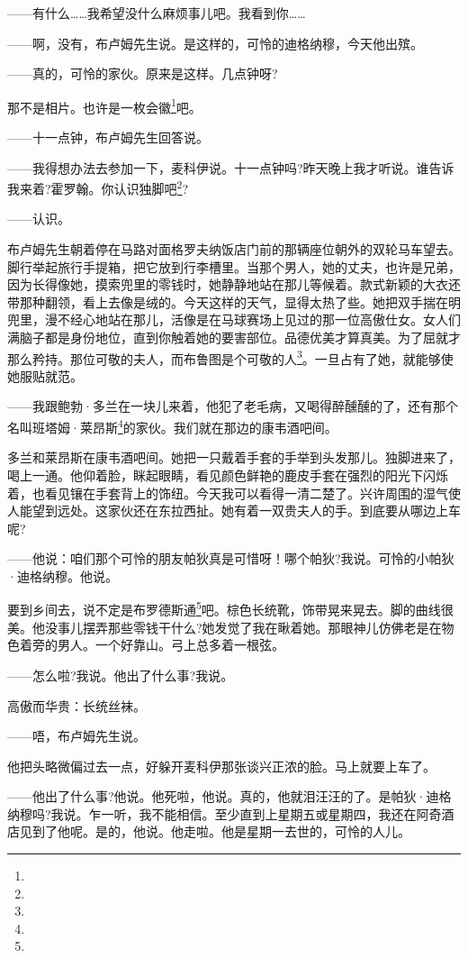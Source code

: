 \par ——有什么……我希望没什么麻烦事儿吧。我看到你……
\par ——啊，没有，布卢姆先生说。是这样的，可怜的迪格纳穆，今天他出殡。
\par ——真的，可怜的家伙。原来是这样。几点钟呀?
\par 那不是相片。也许是一枚会徽\footnote{}吧。
\par ——十一点钟，布卢姆先生回答说。
\par ——我得想办法去参加一下，麦科伊说。十一点钟吗?昨天晚上我才听说。谁告诉我来着?霍罗翰。你认识独脚吧\footnote{}?
\par ——认识。
\par 布卢姆先生朝着停在马路对面格罗夫纳饭店门前的那辆座位朝外的双轮马车望去。脚行举起旅行手提箱，把它放到行李槽里。当那个男人，她的丈夫，也许是兄弟，因为长得像她，摸索兜里的零钱时，她静静地站在那儿等候着。款式新颖的大衣还带那种翻领，看上去像是绒的。今天这样的天气，显得太热了些。她把双手揣在明兜里，漫不经心地站在那儿，活像是在马球赛场上见过的那一位高傲仕女。女人们满脑子都是身份地位，直到你触着她的要害部位。品德优美才算真美。为了屈就才那么矜持。那位可敬的夫人，而布鲁图是个可敬的人\footnote{}。一旦占有了她，就能够使她服贴就范。
\par ——我跟鲍勃·多兰在一块儿来着，他犯了老毛病，又喝得醉醺醺的了，还有那个名叫班塔姆·莱昂斯\footnote{}的家伙。我们就在那边的康韦酒吧间。
\par 多兰和莱昂斯在康韦酒吧间。她把一只戴着手套的手举到头发那儿。独脚进来了，喝上一通。他仰着脸，眯起眼睛，看见颜色鲜艳的鹿皮手套在强烈的阳光下闪烁着，也看见镶在手套背上的饰纽。今天我可以看得一清二楚了。兴许周围的湿气使人能望到远处。这家伙还在东拉西扯。她有着一双贵夫人的手。到底要从哪边上车呢?
\par ——他说：咱们那个可怜的朋友帕狄真是可惜呀！哪个帕狄?我说。可怜的小帕狄·迪格纳穆。他说。
\par 要到乡间去，说不定是布罗德斯通\footnote{}吧。棕色长统靴，饰带晃来晃去。脚的曲线很美。他没事儿摆弄那些零钱干什么?她发觉了我在瞅着她。那眼神儿仿佛老是在物色着旁的男人。一个好靠山。弓上总多着一根弦。
\par ——怎么啦?我说。他出了什么事?我说。
\par 高傲而华贵：长统丝袜。
\par ——唔，布卢姆先生说。
\par 他把头略微偏过去一点，好躲开麦科伊那张谈兴正浓的脸。马上就要上车了。
\par ——他出了什么事?他说。他死啦，他说。真的，他就泪汪汪的了。是帕狄·迪格纳穆吗?我说。乍一听，我不能相信。至少直到上星期五或星期四，我还在阿奇酒店见到了他呢。是的，他说。他走啦。他是星期一去世的，可怜的人儿。
